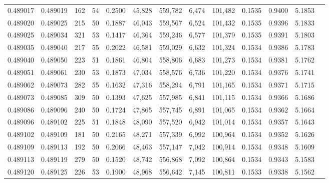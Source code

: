 \begin{tabular}{rrrrrrrrrrrrr}
0.489017 & 0.489019 & 162 &  54 &                                     0.2500 &  45,828 & 559,782 &   6,474 & 101,482 & 0.1535 & 0.9400 & 5.1853 \\
0.489020 & 0.489025 & 215 &  50 &                                     0.1887 &  46,043 & 559,567 &   6,524 & 101,432 & 0.1535 & 0.9396 & 5.1833 \\
0.489025 & 0.489034 & 321 &  53 &                                     0.1417 &  46,364 & 559,246 &   6,577 & 101,379 & 0.1535 & 0.9391 & 5.1803 \\
0.489035 & 0.489040 & 217 &  55 &                                     0.2022 &  46,581 & 559,029 &   6,632 & 101,324 & 0.1534 & 0.9386 & 5.1783 \\
0.489040 & 0.489050 & 223 &  51 &                                     0.1861 &  46,804 & 558,806 &   6,683 & 101,273 & 0.1534 & 0.9381 & 5.1762 \\
0.489051 & 0.489061 & 230 &  53 &                                     0.1873 &  47,034 & 558,576 &   6,736 & 101,220 & 0.1534 & 0.9376 & 5.1741 \\
0.489062 & 0.489073 & 282 &  55 &                                     0.1632 &  47,316 & 558,294 &   6,791 & 101,165 & 0.1534 & 0.9371 & 5.1715 \\
0.489073 & 0.489085 & 309 &  50 &                                     0.1393 &  47,625 & 557,985 &   6,841 & 101,115 & 0.1534 & 0.9366 & 5.1686 \\
0.489086 & 0.489096 & 240 &  50 &                                     0.1724 &  47,865 & 557,745 &   6,891 & 101,065 & 0.1534 & 0.9362 & 5.1664 \\
0.489096 & 0.489102 & 225 &  51 &                                     0.1848 &  48,090 & 557,520 &   6,942 & 101,014 & 0.1534 & 0.9357 & 5.1643 \\
0.489102 & 0.489109 & 181 &  50 &                                     0.2165 &  48,271 & 557,339 &   6,992 & 100,964 & 0.1534 & 0.9352 & 5.1626 \\
0.489109 & 0.489113 & 192 &  50 &                                     0.2066 &  48,463 & 557,147 &   7,042 & 100,914 & 0.1534 & 0.9348 & 5.1609 \\
0.489113 & 0.489119 & 279 &  50 &                                     0.1520 &  48,742 & 556,868 &   7,092 & 100,864 & 0.1534 & 0.9343 & 5.1583 \\
0.489120 & 0.489125 & 226 &  53 &                                     0.1900 &  48,968 & 556,642 &   7,145 & 100,811 & 0.1533 & 0.9338 & 5.1562 \\

\end{tabular}
